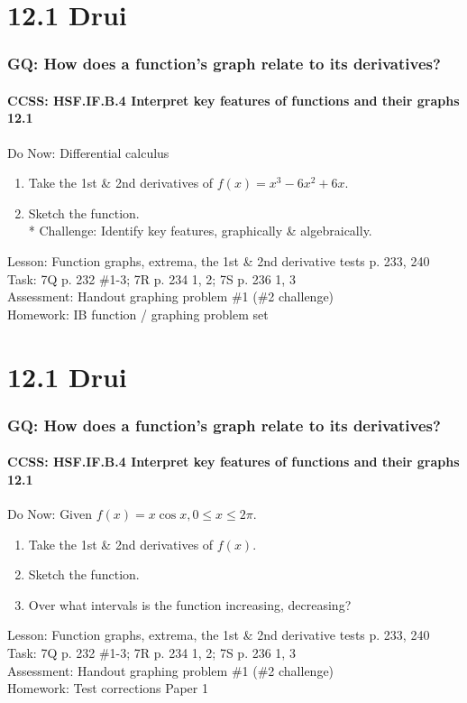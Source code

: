 \documentclass{beamer}
\begin{document}
\section{12.1 Drui}
  \frame
  {
    \frametitle{GQ: How does a function's graph relate to its derivatives?}
    \framesubtitle{CCSS: HSF.IF.B.4 Interpret key features of functions and their graphs \qquad \alert{12.1}}

    \begin{block}{Do Now: Differential calculus}
    \begin{enumerate}
        \item Take the 1st \& 2nd derivatives of $f(x)=x^3-6x^2+6x$.
        \item Sketch the function.\\*
        Challenge: Identify key features, graphically \& algebraically.
    \end{enumerate}
    \end{block}
    Lesson: Function graphs, extrema, the 1st \& 2nd derivative tests p. 233, 240\\%
    Task: 7Q p. 232 \#1-3; 7R p. 234 1, 2; 7S p. 236 1, 3 \\%
    Assessment: Handout graphing problem \#1 (\#2 challenge)
    \\%
    Homework: IB function / graphing problem set
  }

  \section{12.1 Drui}
  \frame
  {
    \frametitle{GQ: How does a function's graph relate to its derivatives?}
    \framesubtitle{CCSS: HSF.IF.B.4 Interpret key features of functions and their graphs \qquad \alert{12.1}}

    \begin{block}{Do Now: Given $f(x)=x \cos x, 0 \leq x \leq 2\pi$.}
    \begin{enumerate}
        \item Take the 1st \& 2nd derivatives of $f(x)$. \item Sketch the function. \item Over what intervals is the function increasing, decreasing?
    \end{enumerate}
    \end{block}
    Lesson: Function graphs, extrema, the 1st \& 2nd derivative tests p. 233, 240\\%
    Task: 7Q p. 232 \#1-3; 7R p. 234 1, 2; 7S p. 236 1, 3 \\%
    Assessment: Handout graphing problem \#1 (\#2 challenge)
    \\%
    Homework: Test corrections Paper 1
  }
\end{document}
